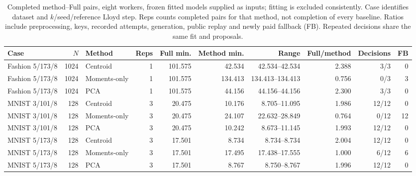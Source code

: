 \begin{table}[tbp]
\centering
\caption{Completed method--Full pairs, eight workers, frozen fitted models supplied as inputs; fitting is excluded consistently. Case identifies dataset and $k$/seed/reference Lloyd step. Reps counts completed pairs for that method, not completion of every baseline. Ratios include preprocessing, keys, recorded attempts, generation, public replay and newly paid fallback (FB). Repeated decisions share the same fit and proposals.}
\label{tab:optimized-proofs}
\begin{adjustbox}{max width=.98\textwidth,center=\textwidth}
\begin{tabular}{lrlrrrrrrr}
\toprule
Case & $N$ & Method & Reps & Full min. & Method min. & Range & Full/method & Decisions & FB\\
\midrule
Fashion 5/173/8 & 1024 & Centroid & 1 & 101.575 & 42.534 & 42.534--42.534 & 2.388 & 3/3 & 0\\
Fashion 5/173/8 & 1024 & Moments-only & 1 & 101.575 & 134.413 & 134.413--134.413 & 0.756 & 0/3 & 3\\
Fashion 5/173/8 & 1024 & PCA & 1 & 101.575 & 44.156 & 44.156--44.156 & 2.300 & 3/3 & 0\\
MNIST 3/101/8 & 128 & Centroid & 3 & 20.475 & 10.176 & 8.705--11.095 & 1.986 & 12/12 & 0\\
MNIST 3/101/8 & 128 & Moments-only & 3 & 20.475 & 24.107 & 22.632--28.849 & 0.764 & 0/12 & 12\\
MNIST 3/101/8 & 128 & PCA & 3 & 20.475 & 10.242 & 8.673--11.145 & 1.993 & 12/12 & 0\\
MNIST 5/173/8 & 128 & Centroid & 3 & 17.501 & 8.734 & 8.734--8.734 & 2.004 & 12/12 & 0\\
MNIST 5/173/8 & 128 & Moments-only & 3 & 17.501 & 17.495 & 17.438--17.555 & 1.000 & 6/12 & 6\\
MNIST 5/173/8 & 128 & PCA & 3 & 17.501 & 8.767 & 8.750--8.767 & 1.996 & 12/12 & 0\\
\bottomrule
\end{tabular}
\end{adjustbox}
\end{table}
